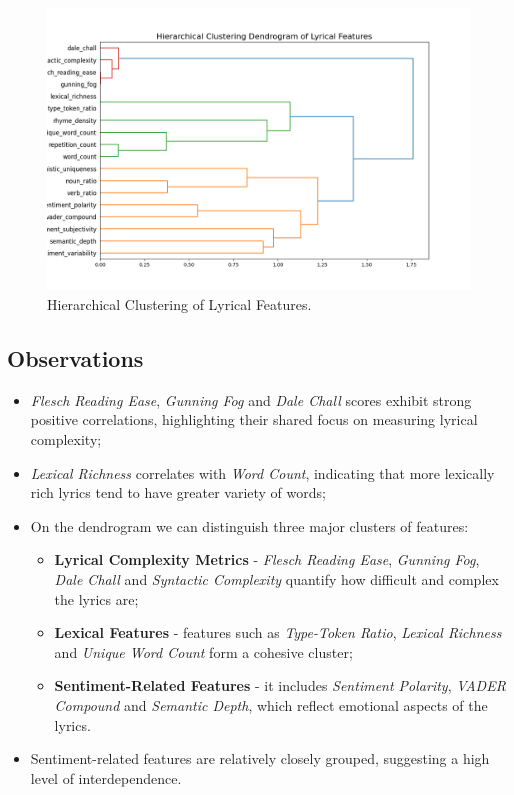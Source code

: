 \begin{center}
\begin{figure}[H]
  \centering
  \includegraphics[width=6in]{img/dendrogram_lyrical.png}
  \caption{Hierarchical Clustering of Lyrical Features.}
  \label{Figure:dendrogram_spotify_features}
\end{figure}
\end{center}


\subsection*{Observations}

\begin{itemize}
  \item \textit{Flesch Reading Ease}, \textit{Gunning Fog} and \textit{Dale
    Chall} scores exhibit strong positive correlations, highlighting their
    shared focus on measuring lyrical complexity;
  \item \textit{Lexical Richness} correlates with \textit{Word Count},
    indicating that more lexically rich lyrics tend to have  greater variety
    of words;
  \item On the dendrogram we can distinguish three major clusters of features:
    \begin{itemize}
      \item \textbf{Lyrical Complexity Metrics} - \textit{Flesch Reading Ease},
        \textit{Gunning Fog}, \textit{Dale Chall} and \textit{Syntactic
        Complexity } quantify how difficult and complex the lyrics are;
      \item  \textbf{Lexical Features} - features such as \textit{Type-Token
        Ratio}, \textit{Lexical Richness} and \textit{Unique Word Count} form a
        cohesive cluster;
      \item \textbf{Sentiment-Related Features} - it includes \textit{Sentiment
        Polarity}, \textit{VADER Compound} and \textit{Semantic Depth}, which
        reflect emotional aspects of the lyrics.
    \end{itemize}
  \item Sentiment-related features are relatively closely grouped, suggesting a
    high level of interdependence.
\end{itemize}


